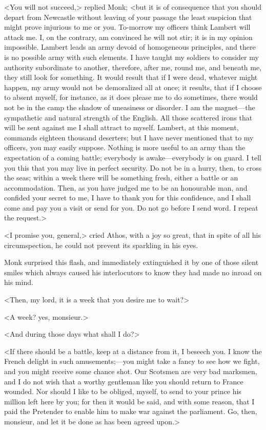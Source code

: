 <You will not succeed,> replied Monk; <but it is of consequence that you should depart from Newcastle without leaving of your passage the least suspicion that might prove injurious to me or you. To-morrow my officers think Lambert will attack me. I, on the contrary, am convinced he will not stir; it is in my opinion impossible. Lambert leads an army devoid of homogeneous principles, and there is no possible army with such elements. I have taught my soldiers to consider my authority subordinate to another, therefore, after me, round me, and beneath me, they still look for something. It would result that if I were dead, whatever might happen, my army would not be demoralized all at once; it results, that if I choose to absent myself, for instance, as it does please me to do sometimes, there would not be in the camp the shadow of uneasiness or disorder. I am the magnet—the sympathetic and natural strength of the English. All those scattered irons that will be sent against me I shall attract to myself. Lambert, at this moment, commands eighteen thousand deserters; but I have never mentioned that to my officers, you may easily suppose. Nothing is more useful to an army than the expectation of a coming battle; everybody is awake—everybody is on guard. I tell you this that you may live in perfect security. Do not be in a hurry, then, to cross the seas; within a week there will be something fresh, either a battle or an accommodation. Then, as you have judged me to be an honourable man, and confided your secret to me, I have to thank you for this confidence, and I shall come and pay you a visit or send for you. Do not go before I send word. I repeat the request.>

<I promise you, general,> cried Athos, with a joy so great, that in spite of all his circumspection, he could not prevent its sparkling in his eyes.

Monk surprised this flash, and immediately extinguished it by one of those silent smiles which always caused his interlocutors to know they had made no inroad on his mind.

<Then, my lord, it is a week that you desire me to wait?>

<A week? yes, monsieur.>

<And during those days what shall I do?>

<If there should be a battle, keep at a distance from it, I beseech you. I know the French delight in such amusements;—you might take a fancy to see how we fight, and you might receive some chance shot. Our Scotsmen are very bad marksmen, and I do not wish that a worthy gentleman like you should return to France wounded. Nor should I like to be obliged, myself, to send to your prince his million left here by you; for then it would be said, and with some reason, that I paid the Pretender to enable him to make war against the parliament. Go, then, monsieur, and let it be done as has been agreed upon.>

